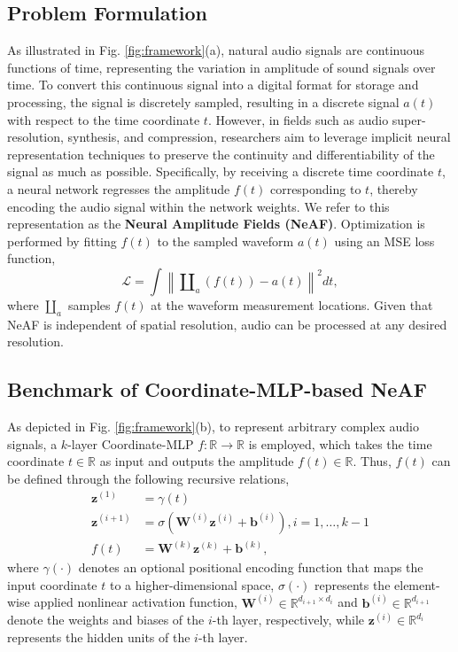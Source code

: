 \documentclass[letterpaper]{article} %
\begin{document}
\subsection{Problem Formulation}
As illustrated in  Fig. \ref{fig:framework}(a), natural audio signals are continuous functions of time, representing the variation in amplitude of sound signals over time. To convert this continuous signal into a digital format for storage and processing, the signal is discretely sampled, resulting in a discrete signal \( a(t) \) with respect to the time coordinate \( t \). However, in fields such as audio super-resolution, synthesis, and compression, researchers aim to leverage implicit neural representation techniques to preserve the continuity and differentiability of the signal as much as possible. Specifically, by receiving a discrete time coordinate \({t}\), a neural network regresses the amplitude \(f(t)\) corresponding to $t$, thereby encoding the audio signal within the network weights. We refer to this representation as the \textbf{Neural Amplitude Fields (NeAF)}. Optimization is performed by fitting \(f(t)\) to the sampled waveform \(a(t)\) using an MSE loss function,
\begin{equation}
    \mathcal{L}=\int \left\|\amalg_a(f({t}))-a({t})\right\|^2 d {t},
\end{equation} where $\amalg_a$ samples $f({t})$ at the waveform measurement locations. Given that NeAF is independent of spatial resolution, audio can be processed at any desired resolution.

\subsection{Benchmark of Coordinate-MLP-based NeAF}
As depicted in Fig. \ref{fig:framework}(b), to represent arbitrary complex audio signals, a $k$-layer Coordinate-MLP \( f: \mathbb{R} \rightarrow \mathbb{R} \) is employed, which takes the time coordinate \( t \in \mathbb{R}\) as input and outputs the amplitude \( f(t) \in \mathbb{R} \). Thus, $f(t)$ can be defined through the following recursive relations,
\begin{equation}
\begin{aligned}
\mathbf{z}^{(1)} & = \gamma({t}) \\
\mathbf{z}^{(i+1)} & =\sigma\left(\mathbf{W}^{(i)} \mathbf{z}^{(i)}+\mathbf{b}^{(i)}\right), i=1, \ldots, k-1 \\
f({t}) & =\mathbf{W}^{(k)} \mathbf{z}^{(k)}+\mathbf{b}^{(k)},
\end{aligned}
\end{equation} where \(\gamma(\cdot)\) denotes an optional positional encoding function that maps the input coordinate $t$ to a higher-dimensional space, \(\sigma(\cdot)\) represents the element-wise applied nonlinear activation function, \(\mathbf{W}^{(i)} \in \mathbb{R}^{d_{i+1} \times d_i}\) and \(\mathbf{b}^{(i)} \in \mathbb{R}^{d_{i+1}}\) denote the weights and biases of the \(i\)-th layer, respectively, while \(\mathbf{z}^{(i)} \in \mathbb{R}^{d_i}\) represents the hidden units of the \(i\)-th layer. 
\end{document}
